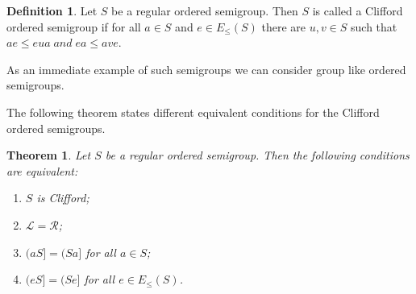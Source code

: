\documentclass[13pt]{article}
\newtheorem{Theorem}[theorem]{Theorem}
\theoremstyle{definition}
\newtheorem{Definition}[theorem]{Definition}
\theoremstyle{remark}
\numberwithin{equation}{section}
\newcommand{\lc}{\mathcal{L}}
\newcommand{\rc}{\mathcal{R}}
\begin{document}
\begin{Definition}
Let $S$ be a regular ordered  semigroup. Then $S$ is called a
Clifford ordered semigroup if for
all $a \in S$ and $e \in E_{\leq}(S)$ there are $u, v \in S$ such
that $ae \leq eua \;and \;ea \leq ave$.
\end{Definition}
As an immediate example of such semigroups we can consider  group
like ordered semigroups.

The following theorem states different equivalent conditions  for
the Clifford ordered semigroups.
\begin{Theorem}\label{cr26}
Let $S$ be a regular ordered  semigroup. Then the following
conditions are equivalent:
\begin{enumerate}
\item \vspace{-.4cm}
$S$ is Clifford;
\item \vspace{-.4cm}
$\lc = \rc$;
\item \vspace{-.4cm}
$(aS] = (Sa]$ for all $a \in S$;
\item \vspace{-.4cm}
$(eS] = (Se]$ for all $e \in E_\leq(S)$.
\end{enumerate}
\end{Theorem}
\end{document}
